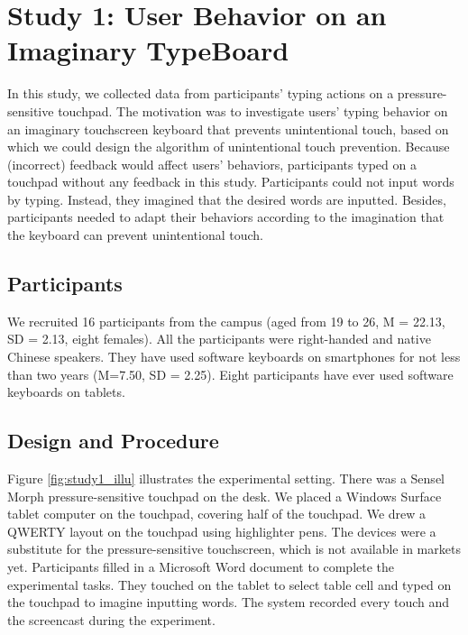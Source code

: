 \section{Study 1: User Behavior on an Imaginary TypeBoard}

In this study, we collected data from participants' typing actions on a pressure-sensitive touchpad. The motivation was to investigate users' typing behavior on an imaginary touchscreen keyboard that prevents unintentional touch, based on which we could design the algorithm of unintentional touch prevention. Because (incorrect) feedback would affect users' behaviors, participants typed on a touchpad without any feedback in this study. Participants could not input words by typing. Instead, they imagined that the desired words are inputted. Besides, participants needed to adapt their behaviors according to the imagination that the keyboard can prevent unintentional touch.

\subsection{Participants}

We recruited 16 participants from the campus (aged from 19 to 26, M = 22.13, SD = 2.13, eight females). All the participants were right-handed and native Chinese speakers. They have used software keyboards on smartphones for not less than two years (M=7.50, SD = 2.25). Eight participants have ever used software keyboards on tablets.

\subsection{Design and Procedure}

Figure \ref{fig:study1_illu} illustrates the experimental setting. There was a Sensel Morph \cite{Website-Morph} pressure-sensitive touchpad on the desk. We placed a Windows Surface tablet computer on the touchpad, covering half of the touchpad. We drew a QWERTY layout on the touchpad using highlighter pens. The devices were a substitute for the pressure-sensitive touchscreen, which is not available in markets yet. Participants filled in a Microsoft Word document to complete the experimental tasks. They touched on the tablet to select table cell and typed on the touchpad to imagine inputting words. The system recorded every touch and the screencast during the experiment.

